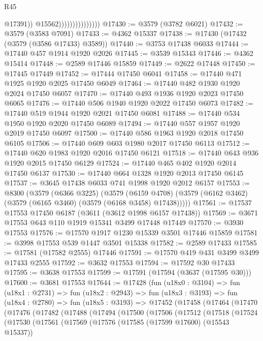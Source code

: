 \begin{lexlean}{R45}
\begin{coremodule}
                                      @17391))
                                  @15562)))))))))))))))
@17430 := @3579 (@3782 @6021)
@17432 := @3579 (@3583 @7091)
@17433 := @4362 @15337
@17438 := @17430 (@17432 (@3579 (@3586 @17433) @3589))
@17440 := @3753 @17438 @6033
@17444 := @17440 @457 @1914 @1920 @2026
@17445 := @3539 @15343
@17446 := @4362 @15414
@17448 := @2589 @17446 @15859
@17449 := @2622 @17448
@17450 := @17445 @17449
@17452 := @17444 @17450 @6041
@17458 := @17440 @471 @1925 @1920 @2025 @17450 @6049
@17464 := @17440 @482 @1930 @1920 @2024 @17450 @6057
@17470 := @17440 @493 @1936 @1920 @2023 @17450 @6065
@17476 := @17440 @506 @1940 @1920 @2022 @17450 @6073
@17482 := @17440 @519 @1944 @1920 @2021 @17450 @6081
@17488 := @17440 @534 @1950 @1920 @2020 @17450 @6089
@17494 := @17440 @557 @1957 @1920 @2019 @17450 @6097
@17500 := @17440 @586 @1963 @1920 @2018 @17450 @6105
@17506 := @17440 @609 @603 @1980 @2017 @17450 @6113
@17512 := @17440 @620 @1983 @1920 @2016 @17450 @6121
@17518 := @17440 @643 @936 @1920 @2015 @17450 @6129
@17524 := @17440 @465 @402 @1920 @2014 @17450 @6137
@17530 := @17440 @664 @1328 @1920 @2013 @17450 @6145
@17537 := @3645 @17438 @6033 @741 @1998 @1920 @2012 @6157
@17553 := @8300
    (@3579
      (@6366 @3225)
      (@3579
        (@6159 @4708)
        (@3579 (@6162 @3462) (@3579 (@6165 @3460) (@3579 (@6168 @3458) @17438)))))
@17561 := @17537 @17553 @17450 @6187 (@3611 (@3612 @1998 @6157 @17438))
@17569 := @3671 @17553 @643 @110 @1919 @15341 @3499 @17448 @17449
@17570 := @3930 @17553
@17576 := @17570 @1917 @1230 @15339 @3501 @17446 @15859
@17581 := @3998 @17553 @539 @1447 @3501 @15338
@17582 := @2589 @17433
@17585 := @17581 (@17582 @2555) @17446
@17591 := @17570 @419 @431 @3499 @3499 @17433 @2555
@17592 := @3632 @17553
@17594 := @17592 @30 @17433
@17595 := @3638 @17553
@17599 := @17591 (@17594 (@3637 (@17595 @30)))
@17600 := @3681 @17553
@17644 := @17428
    (fun (u18x0 : @3104) =>
    fun (u18x1 : @2731) =>
    fun (u18x2 : @2943) =>
    fun (u18x3 : @3193) =>
    fun (u18x4 : @2780) =>
    fun (u18x5 : @3193) =>
    @17452
      (@17458
        (@17464
          (@17470
            (@17476
              (@17482
                (@17488
                  (@17494
                    (@17500
                      (@17506
                        (@17512
                          (@17518
                            (@17524
                              (@17530
                                (@17561
                                  (@17569
                                    (@17576
                                      (@17585 (@17599 @17600) (@15543 @15337))

\end{coremodule}
\end{lexlean}
